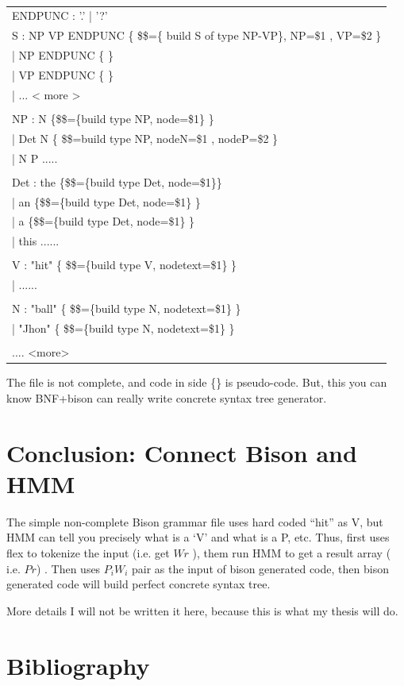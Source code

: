 \setlength{\parwidth}{\linewidth}%
\addtolength{\parwidth}{-1.5\parindent}%
\begin{flushright} \tt
\begin{longtable}{|m{\parwidth}|}\hline

ENDPUNC : '.' | '?'  \\

S : NP VP ENDPUNC \{ \$\$=\{ build S of type NP-VP\}, NP=\$1 , VP=\$2   \}\\
	\qquad	| NP ENDPUNC \{  \}\\
	\qquad	| VP ENDPUNC  \{  \}\\
	\qquad	| ...  < more >  \\ 
\\
NP : N \{\$\$=\{build type NP, node=\$1\} \} \\
\qquad	| Det N \{ \$\$={build type NP, nodeN=\$1 , nodeP=\$2} \} \\
\qquad	| N P ..... \\ 
\\
Det : the  \{\$\$=\{build type Det, node=\$1\}\} \\
\qquad	| an  \{\$\$=\{build type Det, node=\$1\} \} \\
\qquad	| a \{\$\$=\{build type Det, node=\$1\} \} \\
\qquad	| this ...... \\
\\
V : "hit"  \{ \$\$=\{build type V, nodetext=\$1\} \} \\
\qquad	| ...... \\
\\
N : "ball" \{ \$\$=\{build type N, nodetext=\$1\} \} \\
\qquad	| "Jhon" \{ \$\$=\{build type N, nodetext=\$1\} \}  \\
\\
.... <more> \\
\end{longtable}
\end{flushright}

The file is not complete, and code in side \{\} is pseudo-code. But, this you can know BNF+bison 
can really write concrete syntax tree generator. 

\section{Conclusion: Connect Bison and HMM}

The simple non-complete Bison grammar file uses hard coded ``hit'' as V, but HMM can tell you  precisely what is a `V'  and what is a P, etc. Thus, first uses flex to tokenize the input (i.e. get $Wr$ ), them run HMM to get a result array ( i.e. $Pr$) . Then uses $P_{i}W_i$ pair as the
input of bison generated code, then bison generated code will build perfect concrete syntax tree.

More details I will not be written it here, because this is what my thesis will do.

\section{Bibliography}
\nocite{GPL}


